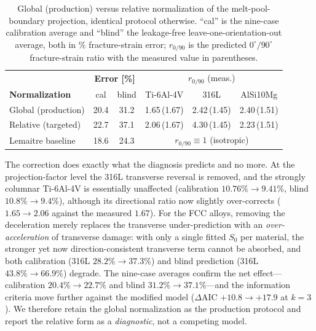 \documentclass[12pt,a4paper,twocolumn]{article}
\begin{document}
\begin{table}[htbp]
\centering
\caption{Global (production) versus relative normalization of the melt-pool-boundary projection, identical protocol otherwise. ``cal'' is the nine-case calibration average and ``blind'' the leakage-free leave-one-orientation-out average, both in \% fracture-strain error; $r_{0/90}$ is the predicted $0^\circ/90^\circ$ fracture-strain ratio with the measured value in parentheses.}
\label{tab:rel_norm}
\small
\setlength{\tabcolsep}{4pt}
\begin{tabular}{l cc ccc}
\toprule
 & \multicolumn{2}{c}{\textbf{Error [\%]}} & \multicolumn{3}{c}{$r_{0/90}$ (meas.)} \\
\textbf{Normalization} & cal & blind & Ti-6Al-4V & 316L & AlSi10Mg \\
\midrule
Global (production)   & 20.4 & 31.2 & 1.65\,(1.67) & 2.42\,(1.45) & 2.40\,(1.51) \\
Relative (targeted)   & 22.7 & 37.1 & 2.06\,(1.67) & 4.30\,(1.45) & 2.23\,(1.51) \\
\midrule
Lemaitre baseline     & 18.6 & 24.3 & \multicolumn{3}{c}{$r_{0/90}\equiv1$ (isotropic)} \\
\bottomrule
\end{tabular}
\end{table}

The correction does exactly what the diagnosis predicts and no more. At the projection-factor level the 316L transverse reversal is removed, and the strongly columnar Ti-6Al-4V is essentially unaffected (calibration $10.76\%\to9.41\%$, blind $10.8\%\to9.4\%$), although its directional ratio now slightly over-corrects ($1.65\to2.06$ against the measured $1.67$). For the FCC alloys, removing the deceleration merely replaces the transverse under-prediction with an \emph{over-acceleration} of transverse damage: with only a single fitted $S_0$ per material, the stronger yet now direction-consistent transverse term cannot be absorbed, and both calibration (316L $28.2\%\to37.3\%$) and blind prediction (316L $43.8\%\to66.9\%$) degrade. The nine-case averages confirm the net effect---calibration $20.4\%\to22.7\%$ and blind $31.2\%\to37.1\%$---and the information criteria move further against the modified model ($\Delta\mathrm{AIC}$ $+10.8\to+17.9$ at $k=3$). We therefore retain the global normalization as the production protocol and report the relative form as a \emph{diagnostic}, not a competing model.
\end{document}
